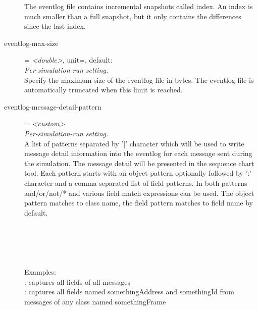 \begin{description}
    The eventlog file contains incremental snapshots called index. An index is
    much smaller than a full snapshot, but it only contains the differences
    since the last index.
\item[eventlog-max-size] = \textit{<double>}, unit=, default: \\
    \textit{Per-simulation-run setting.}\\
    Specify the maximum size of the eventlog file in bytes. The eventlog file
    is automatically truncated when this limit is reached.
\item[eventlog-message-detail-pattern] = \textit{<custom>}\\
    \textit{Per-simulation-run setting.}\\
    A list of patterns separated by '|' character which will be used to write
    message detail information into the eventlog for each message sent during
    the simulation. The message detail will be presented in the sequence chart
    tool. Each pattern starts with an object pattern optionally followed by ':'
    character and a comma separated list of field patterns. In both patterns
    and/or/not/* and various field match expressions can be used. The object
    pattern matches to class name, the field pattern matches to field name by
    default.\\
     
    \\
      \\
      \\
      \\
      \\
    Examples:\\
      \ttt{*}: captures all fields of all messages\\
      : captures all fields
    named somethingAddress and somethingId from messages of any class named
    somethingFrame\\
     

\end{description}
